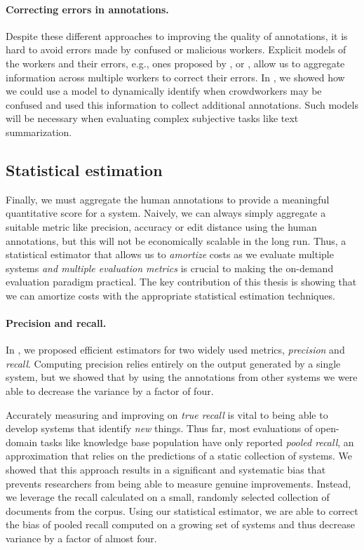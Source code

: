 \paragraph{Correcting errors in annotations.}
Despite these different approaches to improving the quality of annotations, it is hard to avoid errors made by confused or malicious workers.
Explicit models of the workers and their errors, e.g., ones proposed by \citet{dawid1950something}, \citet{passeneau2014benefits} or \citet{}, allow us to aggregate information across multiple workers to correct their errors.
In , we showed how we could use a model to dynamically identify when crowdworkers may be confused and used this information to collect additional annotations.
Such models will be necessary when evaluating complex subjective tasks like text summarization.

\subsection{Statistical estimation}
Finally, we must aggregate the human annotations to provide a meaningful quantitative score for a system.
Naively, we can always simply aggregate a suitable metric like precision, accuracy or edit distance using the human annotations, but this will not be economically scalable in the long run.
Thus, a statistical estimator that allows us to \textit{amortize} costs as we evaluate multiple systems \textit{and multiple evaluation metrics} is crucial to making the on-demand evaluation paradigm practical.
The key contribution of this thesis is showing that we can amortize costs with the appropriate statistical estimation techniques.

\paragraph{Precision and recall.}
In , we proposed efficient estimators for two widely used metrics, \textit{precision} and \textit{recall}.
Computing precision relies entirely on the output generated by a single system, but we showed that by using the annotations from other systems we were able to decrease the variance by a factor of four.

Accurately measuring and improving on \textit{true recall} is vital to being able to develop systems that identify \textit{new} things.
Thus far, most evaluations of open-domain tasks like knowledge base population have only reported \textit{pooled recall}, an approximation that relies on the predictions of a static collection of systems.
We showed that this approach results in a significant and systematic bias that prevents researchers from being able to measure genuine improvements.  
Instead, we leverage the recall calculated on a small, randomly selected collection of documents from the corpus.
Using our statistical estimator, we are able to correct the bias of pooled recall computed on a growing set of systems and thus decrease variance by a factor of almost four.

